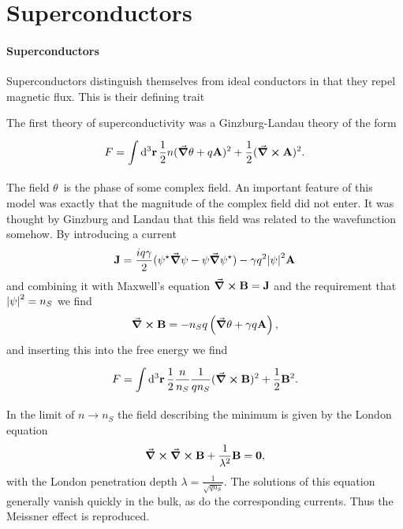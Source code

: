\section{Superconductors}

\paragraph{Superconductors}
Superconductors distinguish themselves from ideal conductors in that they repel magnetic flux. This is their defining trait

The first theory of superconductivity was a Ginzburg-Landau theory of the form
\begin{align*}
	F = \int\limits_{}^{}\dd[3]{\vb{r}}\frac{1}{2}n(\grad{\theta} + q\vb{A})^{2} + \frac{1}{2}(\curl{\vb{A}})^{2}.
\end{align*}
The field $\theta$ is the phase of some complex field. An important feature of this model was exactly that the magnitude of the complex field did not enter. It was thought by Ginzburg and Landau that this field was related to the wavefunction somehow. By introducing a current
\begin{align*}
	\vb{J} = \frac{iq\gamma}{2}(\psi^{\star}\grad{\psi} - \psi\grad{\psi\ensuremath{^{\star}}}) - \gamma q^{2}\abs{\psi}^{2}\vb{A}
\end{align*}
and combining it with Maxwell's equation $\curl{\vb{B}} = \vb{J}$ and the requirement that $\abs{\psi}^{2} = n_{S}$ we find
\begin{align*}
	\curl{\vb{B}} = -n_{S}q\left(\grad{\theta} + \gamma q\vb{A}\right),
\end{align*}
and inserting this into the free energy we find
\begin{align*}
	F = \int\limits_{}^{}\dd[3]{\vb{r}}\frac{1}{2}\frac{n}{n_{S}}\frac{1}{qn_{S}}(\curl{\vb{B}})^{2} + \frac{1}{2}\vb{B}^{2}.
\end{align*}
In the limit of $n\to n_{S}$ the field describing the minimum is given by the London equation
\begin{align*}
	\curl{\curl{\vb{B}}} + \frac{1}{\lambda^{2}}\vb{B} = \vb{0},
\end{align*}
with the London penetration depth $\lambda = \frac{1}{\sqrt{qn_{S}}}$. The solutions of this equation generally vanish quickly in the bulk, as do the corresponding currents. Thus the Meissner effect is reproduced.

